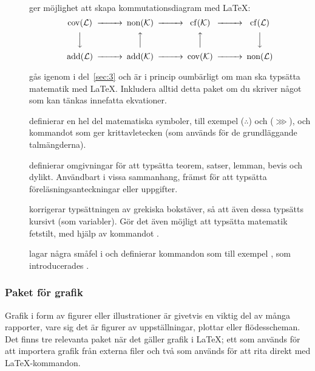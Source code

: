 \documentclass[../../latex.tex]{subfiles}
\begin{document}
\begin{description}
	\item[]
	ger möjlighet att skapa kommutationsdiagram med \LaTeX:
	\begin{equation*}
		\begin{CD}
			\cov(\mathcal{L}) @>>> \non(\mathcal{K}) @>>> \cf(\mathcal{K}) @>>> \cf(\mathcal{L})\\
			@VVV @AAA @AAA @VVV\\
			\add(\mathcal{L}) @>>> \add(\mathcal{K}) @>>> \cov(\mathcal{K}) @>>> \non(\mathcal{L})
		\end{CD}
	\end{equation*}
	
	\item[]
	gås igenom i del~\ref{sec:3} och är i princip oumbärligt om man ska
	typsätta matematik med \LaTeX. Inkludera alltid detta paket om du
	skriver något som kan tänkas innefatta ekvationer.

	\item[]
	definierar en hel del matematiska symboler, till exempel 
	 (\(\therefore\)) och  (\(\ggg\)), och 
	kommandot  som ger krittavletecken (som
	används för de grundläggande talmängderna).
	
	\item[]
	definierar omgivningar för att typsätta teorem, satser, lemman, bevis
	och dylikt. Användbart i vissa sammanhang, främst för att typsätta
	föreläsningsanteckningar eller uppgifter. 
	
	\item[]
	korrigerar typsättningen av grekiska bokstäver, så att även dessa typsätts
	kursivt (som variabler). Gör det även möjligt att typsätta matematik fetstilt,
	med hjälp av kommandot .
	
	\item[]
	lagar några småfel i  och definierar kommandon som till
	exempel , som introducerades
	.
\end{description}

\subsubsection{Paket för grafik}
Grafik i form av figurer eller illustrationer är givetvis en viktig del
av många rapporter, vare sig det är figurer av uppställningar, plottar
eller flödesscheman. Det finns tre relevanta paket när det gäller grafik
i \LaTeX; ett som används för att importera grafik från externa filer och
två som används för att rita direkt med \LaTeX-kommandon.
\end{document}

